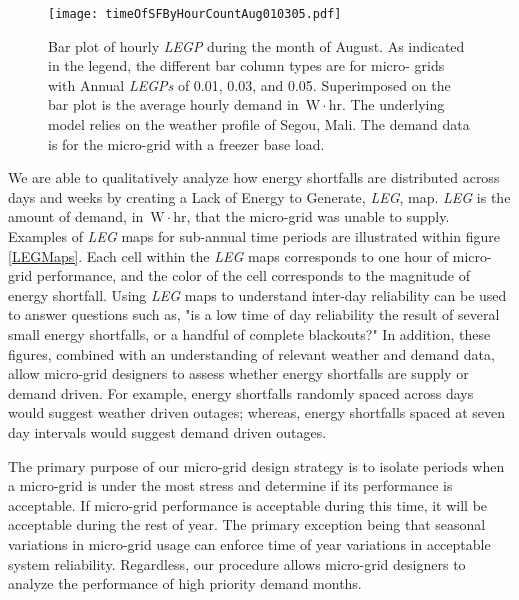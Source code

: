 \documentclass[11p]{article}
\newcommand{\unit}[1]{\ensuremath{\, \mathrm{#1}}}
\begin{document}

\begin{figure}[ht] 
  \centering
    \texttt{[image: timeOfSFByHourCountAug010305.pdf]}
  \caption{Bar plot of hourly \emph{LEGP} during the month of August. 
  As indicated in the legend, the different bar column types are for micro-	
  grids with Annual \emph{LEGPs} of 0.01, 0.03, and 0.05.
  Superimposed on the bar plot is the average hourly demand in \unit{W\! \cdot \! hr}.
  The underlying model relies on the weather profile of Segou, Mali.
  The demand data is for the micro-grid with a freezer base load.}
\label{HourBar}
\end{figure}



We are able to qualitatively analyze how energy shortfalls are distributed across days and weeks by creating a Lack of Energy to Generate, \emph{LEG}, map. 
\emph{LEG} is the amount of demand, in \unit{W\! \cdot \! hr}, that the micro-grid was unable to supply.
Examples of \emph{LEG} maps for sub-annual time periods are illustrated within figure \ref{LEGMaps}.
Each cell within the \emph{LEG} maps corresponds to one hour of micro-grid performance, and the color of the cell corresponds to the magnitude of energy shortfall. 
Using \emph{LEG} maps to understand inter-day reliability can be used to answer questions such as, "is a low time of day reliability the result of several small energy shortfalls, or a handful of complete blackouts?" 
In addition, these figures, combined with an understanding of relevant weather and demand data, allow micro-grid designers to assess whether energy shortfalls are supply or demand driven. 
For example, energy shortfalls randomly spaced across days would suggest weather driven outages; whereas, energy shortfalls spaced at seven day intervals would suggest demand driven outages. 


The primary purpose of our micro-grid design strategy is to isolate periods when a micro-grid is under the most stress and determine if its performance is acceptable.
If micro-grid performance is acceptable during this time, it will be acceptable during the rest of year.
The primary exception being that seasonal variations in micro-grid usage can enforce time of year variations in acceptable system reliability. 
Regardless, our procedure allows micro-grid designers to analyze the performance of high priority demand months. 
\end{document}
